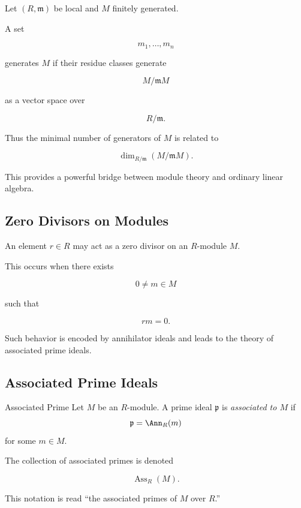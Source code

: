 Let \((R,\mathfrak m)\) be local and \(M\) finitely generated.

A set

\[ m_1,\ldots,m_n \]

generates \(M\) if their residue classes generate

\[ M/\mathfrak mM \]

as a vector space over

\[ R/\mathfrak m. \]

Thus the minimal number of generators of \(M\) is related to

\[ \dim_{R/\mathfrak m}(M/\mathfrak mM). \]

This provides a powerful bridge between module theory and ordinary linear
algebra.

\subsection{Zero Divisors on Modules}
\label{subsec:zero-divisors-modules}

An element \(r\in R\) may act as a zero divisor on an \(R\)-module \(M\).

This occurs when there exists

\[ 0\neq m\in M \]

such that

\[ rm=0. \]

Such behavior is encoded by annihilator ideals and leads to the theory of
associated prime ideals.

\subsection{Associated Prime Ideals}
\label{subsec:associated-primes}

\begin{definitionbox}{Associated Prime}
Let \(M\) be an \(R\)-module. A prime ideal \(\mathfrak p\) is
\emph{associated to \(M\)} if
\[ \mathfrak p=\Ann_R(m) \]
for some \(m\in M\).
\end{definitionbox}

The collection of associated primes is denoted

\[ \operatorname{Ass}_R(M). \]

This notation is read ``the associated primes of \(M\) over \(R\).''

